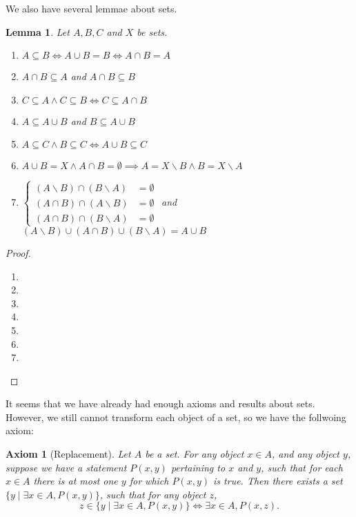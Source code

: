 \documentclass[a4paper,oneside]{book}
\newtheorem*{proof}{\textit{Proof.}}
\newtheorem{axiom}{Axiom}[chapter]
\newtheorem{lemma}{Lemma}[section]
\begin{document}
			We also have several lemmae about sets.
			\begin{lemma}
				Let $A,B,C$ and $X$ be sets.
				\begin{enumerate}[label=($\alph*$)]
					\item $A\subseteq B\iff A\cup B=B\iff A\cap B=A$
					\item $A\cap B\subseteq A$ and $A\cap B\subseteq B$
					\item $C\subseteq A\land C\subseteq B\iff C\subseteq A\cap B$
					\item $A\subseteq A\cup B$ and $B\subseteq A\cup B$
					\item $A\subseteq C\land B\subseteq C\iff A\cup B\subseteq C$
					\item $A\cup B=X\land A\cap B=\emptyset\implies A=X\backslash B\land B=X\backslash A$
					\item 	$\left\{
									\begin{aligned}
										(A\backslash B)\cap (B\backslash A)&=\emptyset\\
										(A\cap B)\cap (A\backslash B)&=\emptyset\\
										(A\cap B)\cap (B\backslash A)&=\emptyset
									\end{aligned}
									\right.$ and $(A\backslash B)\cup(A\cap B)\cup(B\backslash A)=A\cup B$
				\end{enumerate}
			\end{lemma}
			\begin{proof}~
				\begin{enumerate}[label=($\alph*$)]
					\item
					\item
					\item
					\item
					\item
					\item
					\item
				\end{enumerate}
			\end{proof}
			It seems that we have already had enough axioms and results about sets. However, we still cannot transform each object of a set, so we have the follwoing axiom:
			\begin{axiom}[Replacement]
				Let $A$ be a set. For any object $x\in A$, and any object $y$, suppose we have a statement $P(x,y)$ pertaining to $x$ and $y$, such that for each $x\in A$ there is at most one $y$ for which $P(x,y)$ is true. Then there exists a set $\{y\mid\exists x\in A,P(x,y)\}$, such that for any object $z$, $$z\in\{y\mid\exists x\in A,P(x,y)\}\iff \exists x\in A, P(x,z).$$
			\end{axiom}
\end{document}
